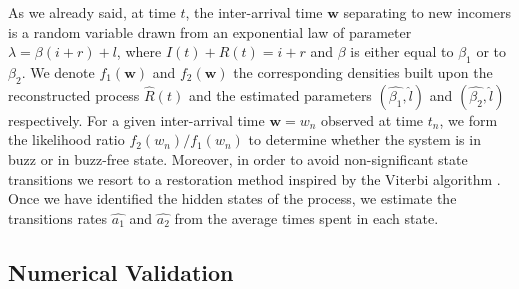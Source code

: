\documentclass[twoside]{article}
\begin{document}
 As we already said, at time $t$, the inter-arrival time $\mathbf{w}$ separating to new incomers is a random variable drawn from an exponential law of parameter $\lambda = \beta(i+r)+l$, where $I(t)+R(t)=i+r$ and $\beta$ is either equal to $\beta_1$ or to $\beta_2$. We denote $f_1(\mathbf{w})$ and $f_2(\mathbf{w})$ the corresponding densities built upon the reconstructed process $\widehat{R}(t)$ and  the estimated parameters $(\widehat{\beta_1}, \widehat{l})$ and $(\widehat{\beta_2}, \widehat{l})$ respectively.  For a given inter-arrival time $\mathbf{w}=w_n$ observed at time $t_n$, we form the likelihood ratio $ f_2(w_n)/f_1(w_n) $ to determine whether the system is in buzz or in buzz-free state. Moreover, in order to avoid non-significant state transitions we resort to a restoration method inspired by the Viterbi algorithm \cite{Kleinberg2002}.
Once we have identified the hidden states of the process, we estimate the transitions rates $\widehat{a_1}$ and $\widehat{a_2}$ from the average times spent in each state.




\subsection{Numerical Validation}
\label{sec:est_results}
\end{document}
